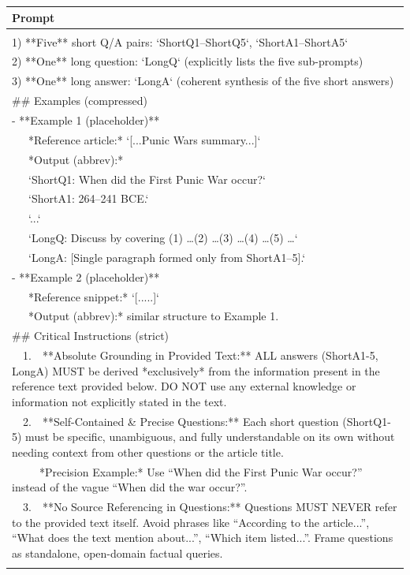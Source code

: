 \documentclass[11pt]{article}
\begin{document}
\begin{table}[t]
\scriptsize
\centering
\begin{tabular}{@{}p{\textwidth}@{}}
\hline
\textbf{Prompt} \\
\hline \hline
{\raggedright\ttfamily
Given a *reference article* (plain text), generate **exactly**:\\
1) **Five** short Q/A pairs: `ShortQ1--ShortQ5`, `ShortA1--ShortA5`  \\
2) **One** long question: `LongQ` (explicitly lists the five sub-prompts)  \\
3) **One** long answer: `LongA` (coherent synthesis of the five short answers)\\
\#\# Examples (compressed)\\
- **Example 1 (placeholder)**  \\
\ \ \ *Reference article:* `[...Punic Wars summary...]`  \\
\ \ \ *Output (abbrev):*  \\
\ \ \ `ShortQ1: When did the First Punic War occur?`  \\
\ \ \ `ShortA1: 264--241 BCE.`  \\
\ \ \ `...`  \\
\ \ \ `LongQ: Discuss by covering (1) \dots (2) \dots (3) \dots (4) \dots (5) \dots`   \\
\ \ \ `LongA: [Single paragraph formed only from ShortA1--5].`\\
- **Example 2 (placeholder)**  \\
\ \ \ *Reference snippet:* `[.....]`  \\
\ \ \ *Output (abbrev):* similar structure to Example 1.\\
\#\# Critical Instructions (strict)\\
\ \ 1.\ \ **Absolute Grounding in Provided Text:** ALL answers (ShortA1-5, LongA) MUST be derived *exclusively* from the information present in the reference text provided below. DO NOT use any external knowledge or information not explicitly stated in the text.\\
\ \ 2.\ \ **Self-Contained \& Precise Questions:** Each short question (ShortQ1-5) must be specific, unambiguous, and fully understandable on its own without needing context from other questions or the article title.\\
\ \ \ \ \ *Precision Example:* Use ``When did the First Punic War occur?'' instead of the vague ``When did the war occur?''.\\
\ \ 3.\ \ **No Source Referencing in Questions:** Questions MUST NEVER refer to the provided text itself. Avoid phrases like ``According to the article...'', ``What does the text mention about...'', ``Which item listed...''. Frame questions as standalone, open-domain factual queries.\\
}
\end{tabular}
\end{table}
\end{document}
